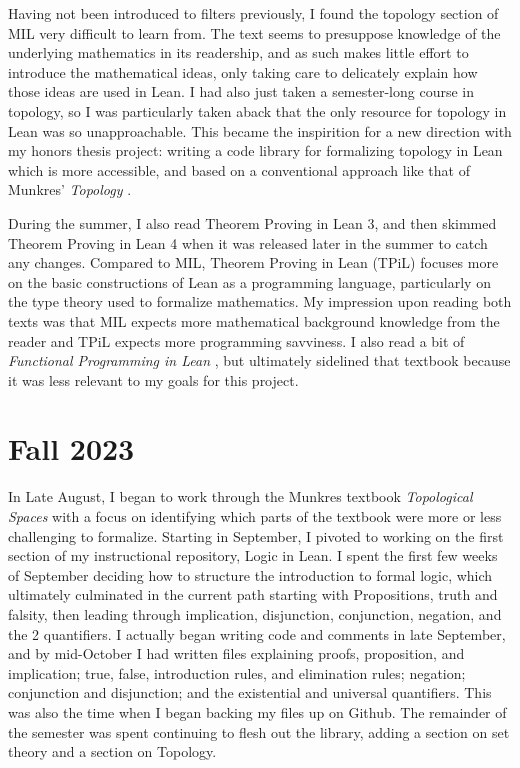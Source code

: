 Having not been introduced to filters previously, I found the
topology section of MIL very difficult to learn from. The text seems 
to presuppose knowledge of the underlying mathematics in its readership,
and as such makes little effort to introduce the mathematical ideas, 
only taking care to delicately explain how those ideas are used in Lean.
I had also just taken a semester-long course in topology, so I was particularly 
taken aback that the only resource for topology in Lean was so unapproachable.
This became the inspirition for a new direction with my honors thesis project:
writing a code library for formalizing topology in Lean which is more accessible,
and based on a conventional approach like that of Munkres' \textit{Topology} \cite{Munkres}.

During the summer, I also read Theorem Proving in Lean 3, and then
skimmed Theorem Proving in Lean 4 when it was released later in the 
summer to catch any changes. Compared to MIL, Theorem Proving in Lean (TPiL) focuses
more on the basic constructions of Lean as a programming language, particularly
on the type theory used to formalize mathematics. My impression upon reading both
texts was that MIL expects more mathematical background knowledge from the reader
and TPiL expects more programming savviness. I also read a bit of 
\textit{Functional Programming in Lean} \cite{FPiL}, but ultimately sidelined that
textbook because it was less relevant to my goals for this project. 

\section{Fall 2023}

In Late August, I began to work through the Munkres textbook
\textit{Topological Spaces} with a focus on identifying which parts
of the textbook were more or less challenging to formalize. 
Starting in September, I pivoted to working on the first section
of my instructional repository, Logic in Lean. I spent the first few 
weeks of September deciding how to structure the introduction to 
formal logic, which ultimately culminated in the current path
starting with Propositions, truth and falsity, then leading through
implication, disjunction, conjunction, negation, and the 2 quantifiers.
I actually began writing code and comments in late September, and by
mid-October I had written files explaining proofs, proposition, and
implication; true, false, introduction rules, and elimination rules;
negation; conjunction and disjunction; and the existential and 
universal quantifiers. This was also the time when I began backing 
my files up on Github. The remainder of the semester was spent 
continuing to flesh out the library, adding a section on set theory
and a section on Topology.

